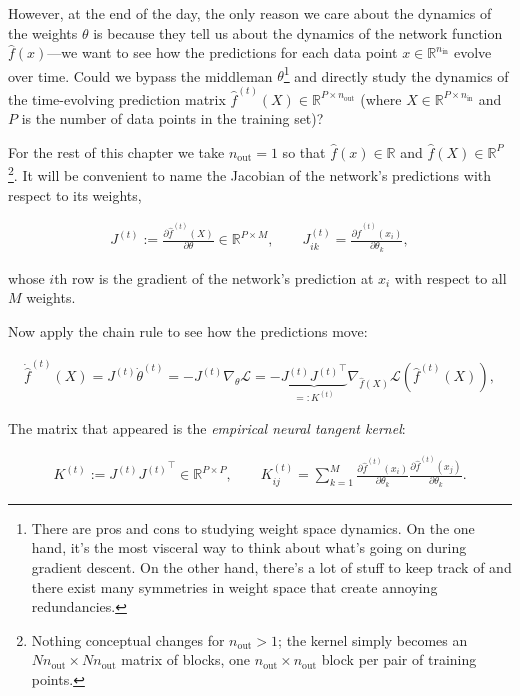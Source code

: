 However, at the end of the day, the only reason we care about the dynamics of
the weights $\theta$ is because they tell us about the dynamics of 
the network function $\hat{f}(x)$---we want to see how
the predictions for each data point $x\in\mathbb{R}^{n_{\text{in}}}$ evolve over time.
Could we bypass the middleman $\theta$\footnote{There are pros and cons to studying weight
space dynamics. On the one hand, it's the most visceral way to think about
what's going on during gradient descent. On the other hand, there's a lot of stuff
to keep track of and there exist many symmetries in weight space that create
annoying redundancies.}
 and directly
study the dynamics of the time-evolving prediction matrix
$\hat{f}^{(t)}(X)\in\mathbb{R}^{P\times n_{\text{out}}}$ 
(where $X\in\mathbb{R}^{P\times {n_{\text{in}}}}$
and $P$ is the number of data points in the training set)? 

For the rest of this chapter we take $n_\text{out}=1$ so that $\hat{f}(x)\in\mathbb{R}$ and
$\hat{f}(X)\in\mathbb{R}^P$\footnote{Nothing conceptual changes for $n_\text{out}>1$; the kernel
simply becomes an $Nn_\text{out}\times Nn_\text{out}$ matrix of blocks, one $n_\text{out}\times
n_\text{out}$ block per pair of training points.}. It will be convenient to name the Jacobian of the
network's predictions with respect to its weights,

\begin{align}
J^{(t)} := \frac{\partial \hat{f}^{(t)}(X)}{\partial \theta} \in\mathbb{R}^{P\times M},
\qquad
J^{(t)}_{ik} = \frac{\partial \hat{f}^{(t)}(x_i)}{\partial \theta_k},
\end{align}

whose $i$th row is the gradient of the network's prediction at $x_i$ with respect to all $M$
weights.

Now apply the chain rule to see how the predictions move:

\begin{align}
\dot{\hat{f}}^{(t)}(X)
= J^{(t)}\dot{\theta}^{(t)}
= - J^{(t)} \nabla_{\theta}\mathcal{L}
= - \underbrace{J^{(t)} {J^{(t)}}^{\top}}_{=:K^{(t)}}
\nabla_{\hat{f}(X)}\mathcal{L}\left(\hat{f}^{(t)}(X)\right),
\label{ch3-ntk-v2}
\end{align}

The matrix that
appeared is the \textit{empirical neural tangent kernel}:

\begin{align}
K^{(t)} := J^{(t)}{J^{(t)}}^\top \in\mathbb{R}^{P\times P},
\qquad
K^{(t)}_{ij} = \sum^M_{k=1} \frac{\partial \hat{f}^{(t)}(x_i)}{\partial \theta_k}
\frac{\partial \hat{f}^{(t)}(x_j)}{\partial \theta_k}.
\end{align}

